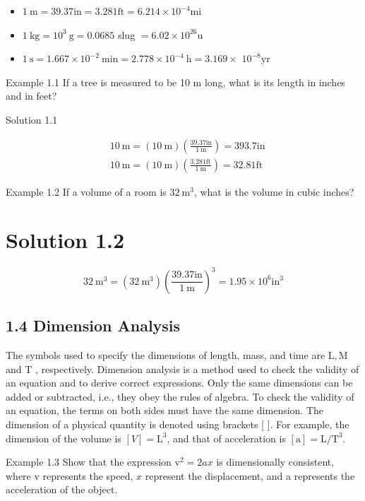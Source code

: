 \documentclass[10pt]{article}
\begin{document}
\begin{itemize}
  \item $1 \mathrm{~m}=39.37 \mathrm{in}=3.281 \mathrm{ft}=6.214 \times 10^{-4} \mathrm{mi}$
  \item $1 \mathrm{~kg}=10^{3} \mathrm{~g}=0.0685$ slug $=6.02 \times 10^{26} \mathrm{u}$
  \item $1 \mathrm{~s}=1.667 \times 10^{-2} \mathrm{~min}=2.778 \times 10^{-4} \mathrm{~h}=3.169 \times$ $10^{-8} \mathrm{yr}$
\end{itemize}

Example 1.1 If a tree is measured to be 10 m long, what is its length in inches and in feet?

Solution 1.1

$$
\begin{aligned}
& 10 \mathrm{~m}=(10 \mathrm{~m})\left(\frac{39.37 \mathrm{in}}{1 \mathrm{~m}}\right)=393.7 \mathrm{in} \\
& 10 \mathrm{~m}=(10 \mathrm{~m})\left(\frac{3.281 \mathrm{ft}}{1 \mathrm{~m}}\right)=32.81 \mathrm{ft}
\end{aligned}
$$

Example 1.2 If a volume of a room is $32 \mathrm{~m}^{3}$, what is the volume in cubic inches?

\section*{Solution 1.2}
$$
32 \mathrm{~m}^{3}=\left(32 \mathrm{~m}^{3}\right)\left(\frac{39.37 \mathrm{in}}{1 \mathrm{~m}}\right)^{3}=1.95 \times 10^{6} \mathrm{in}^{3}
$$

\subsection*{1.4 Dimension Analysis}
The symbols used to specify the dimensions of length, mass, and time are $\mathrm{L}, \mathrm{M}$ and T , respectively. Dimension analysis is a method used to check the validity of an equation and to derive correct expressions. Only the same dimensions can be added or subtracted, i.e., they obey the rules of algebra. To check the validity of an equation, the terms on both sides must have the same dimension. The dimension of a physical quantity is denoted using brackets [ ]. For example, the dimension of the volume is $[V]=\mathrm{L}^{3}$, and that of acceleration is $[\mathrm{a}]=\mathrm{L} / \mathrm{T}^{3}$.

Example 1.3 Show that the expression $\mathrm{v}^{2}=2 a x$ is dimensionally consistent, where v represents the speed, $x$ represent the displacement, and a represents the acceleration of the object.
\end{document}
